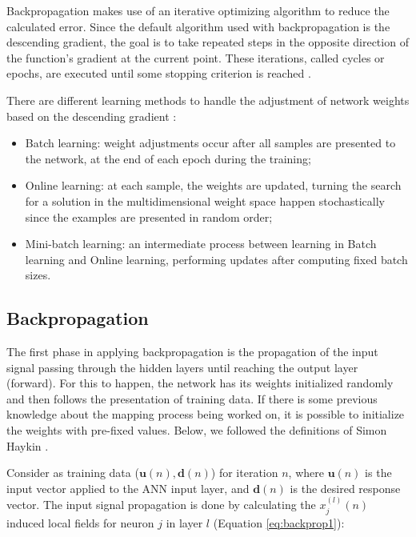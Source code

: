 Backpropagation makes use of an iterative optimizing algorithm to reduce the calculated error. Since the default algorithm used with backpropagation is the descending gradient, the goal is to take repeated steps in the opposite direction of the function's gradient at the current point. These iterations, called cycles or epochs, are executed until some stopping criterion is reached \cite{Castro2006FundamentalsON}.

There are different learning methods to handle the adjustment of network weights based on the descending gradient \cite{haykin, Bengio2012}:

\begin{itemize}
	\item Batch learning: weight adjustments occur after all samples are presented to the network, at the end of each epoch during the training;  %
	\item Online learning: at each sample, the weights are updated, turning the search for a solution in the multidimensional weight space happen stochastically since the examples are presented in random order;
	\item Mini-batch learning: an intermediate process between learning in Batch learning and Online learning, performing updates after computing fixed batch sizes.
\end{itemize}

\subsection{Backpropagation}
\label{ssec:Pseudocodigo}

The first phase in applying backpropagation is the propagation of the input signal passing through the hidden layers until reaching the output layer (forward). For this to happen, the network has its weights initialized randomly and then follows the presentation of training data. If there is some previous knowledge about the mapping process being worked on, it is possible to initialize the weights with pre-fixed values. Below, we followed the definitions of Simon Haykin \cite{haykin}.

Consider as training data ($\mathbf{u}(n), \mathbf{d}(n)$) for iteration $n$, where $\mathbf{u}(n)$ is the input vector applied to the ANN input layer, and $\mathbf{d}(n)$ is the desired response vector. The input signal propagation is done by calculating the $x_j^{(l)}(n)$ induced local fields for neuron $j$ in layer $l$ (Equation \ref{eq:backprop1}):

